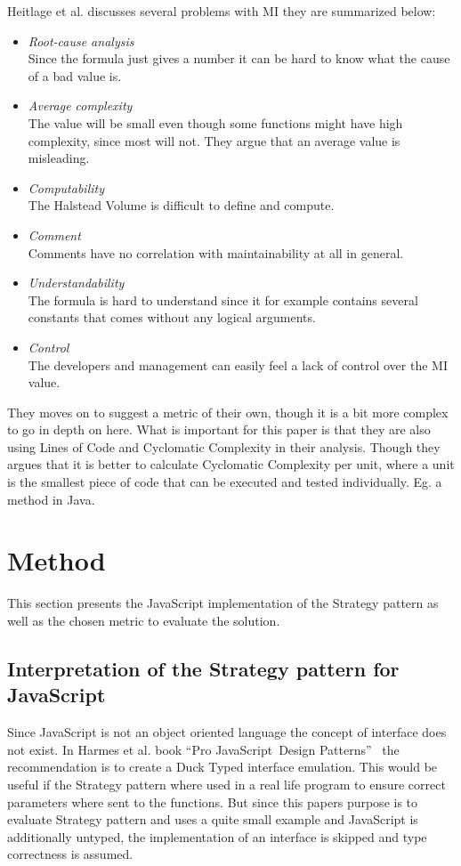 \documentclass[conference, a4paper]{IEEEtran}
\begin{document}
Heitlage et al. discusses several problems with MI they are summarized below:
\begin{itemize}
    \item \emph{Root-cause analysis} \\
    Since the formula just gives a number it can be hard to know what the cause of a bad value is.
    \item \emph{Average complexity} \\
    The value will be small even though some functions might have high complexity, since most will not. They argue that an average value is misleading.
    \item \emph{Computability} \\
		The Halstead Volume is difficult to define and compute.
    \item \emph{Comment} \\
		Comments have no correlation with maintainability at all in general.
    \item \emph{Understandability} \\
		The formula is hard to understand since it for example contains several constants that comes without any logical arguments.
		\item \emph{Control} \\
		The developers and management can easily feel a lack of control over the MI value.
\end{itemize}
They moves on to suggest a metric of their own, though it is a bit more complex to go in depth on here. What is important for this paper is that they are also using Lines of Code and Cyclomatic Complexity in their analysis. Though they argues that it is better to calculate Cyclomatic Complexity per unit, where a unit is the smallest piece of code that can be executed and tested individually. Eg. a method in Java.~\cite{bibitem:Maintainability}

\section{Method}
This section presents the JavaScript implementation of the Strategy pattern as well as the chosen metric to evaluate the solution.

\subsection{Interpretation of the Strategy pattern for JavaScript}
\label{sec:JavaScript}
Since JavaScript is not an object oriented language the concept of interface does not exist. In Harmes et al. book ``Pro JavaScript\texttrademark~Design Patterns''~\cite{bibitem:DiazHarmes} the recommendation is to create a Duck Typed interface emulation. This would be useful if the Strategy pattern where used in a real life program to ensure correct parameters where sent to the functions. But since this papers purpose is to evaluate Strategy pattern and uses a quite small example and JavaScript is additionally untyped, the implementation of an interface is skipped and type correctness is assumed.
\end{document}
